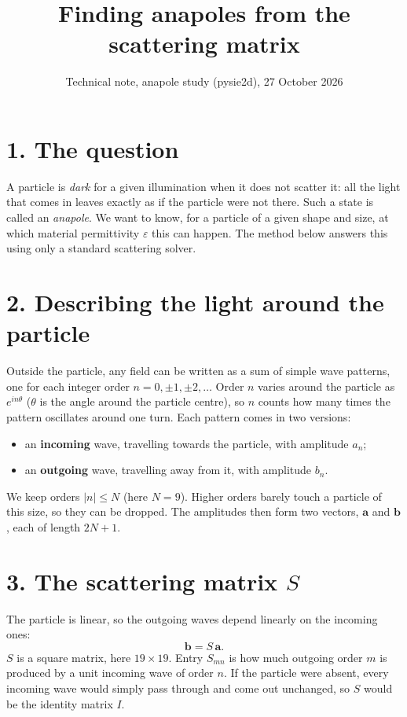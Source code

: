 \documentclass[10pt,a4paper]{article}
\title{\vspace{-1.2cm}Finding anapoles from the scattering matrix}
\author{Technical note, anapole study (pysie2d), 27 October 2026}
\date{\vspace{-0.8cm}}
\begin{document}
\maketitle

\section*{1. The question}
A particle is \emph{dark} for a given illumination when it does not scatter it: all the light that
comes in leaves exactly as if the particle were not there. Such a state is called an \emph{anapole}.
We want to know, for a particle of a given shape and size, at which material permittivity
$\varepsilon$ this can happen. The method below answers this using only a standard scattering solver.

\section*{2. Describing the light around the particle}
Outside the particle, any field can be written as a sum of simple wave patterns, one for each
integer order $n = 0, \pm1, \pm2,\dots$ Order $n$ varies around the particle as $e^{in\theta}$
($\theta$ is the angle around the particle centre), so $n$ counts how many times the pattern
oscillates around one turn. Each pattern comes in two versions:
\begin{itemize}
\item an \textbf{incoming} wave, travelling towards the particle, with amplitude $a_n$;
\item an \textbf{outgoing} wave, travelling away from it, with amplitude $b_n$.
\end{itemize}
We keep orders $|n|\le N$ (here $N=9$). Higher orders barely touch a particle of this size,
so they can be dropped. The amplitudes then form two vectors, $\mathbf a$ and $\mathbf b$, each
of length $2N+1$.

\section*{3. The scattering matrix $S$}
The particle is linear, so the outgoing waves depend linearly on the incoming ones:
\[
\mathbf b = S\,\mathbf a .
\]
$S$ is a square matrix, here $19\times19$. Entry $S_{mn}$ is how much outgoing order $m$ is
produced by a unit incoming wave of order $n$. If the particle were absent, every incoming wave
would simply pass through and come out unchanged, so $S$ would be the identity matrix $I$.
\end{document}
